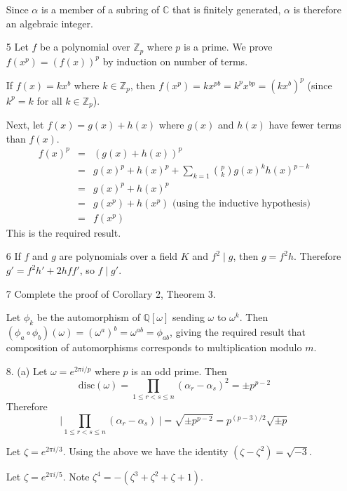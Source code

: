 \documentclass{article}
\newcommand{\w}[0]{\omega}
\newcommand{\z}[0]{\zeta}
\begin{document}
\begin{enumerate}
    Since $\alpha$ is a member of a subring of $\mathbb{C}$ that is finitely generated, $\alpha$ is therefore an algebraic integer.

\item[5]
    Let $f$ be a polynomial over $\mathbb{Z}_p$ where $p$ is a prime.  We prove $f(x^p) = (f(x))^p$ by induction on number of terms.

    If $f(x) = kx^{b}$ where $k \in \mathbb{Z}_p$, then $f(x^p) = kx^{pb} = k^p x^{bp} = (kx^{b})^p$ (since $k^p = k$ for all $k \in \mathbb{Z}_p$).

    Next, let $f(x) = g(x) + h(x)$ where $g(x)$ and $h(x)$ have fewer terms than $f(x)$.
    \begin{eqnarray*}
        f(x)^p          &=& (g(x) + h(x))^p \\
                        &=& g(x)^p + h(x)^p + \sum_{k = 1} \binom{p}{k} g(x)^{k} h(x)^{p - k} \\
                        &=& g(x)^p + h(x)^p \\
                        &=& g(x^p) + h(x^p) \text{ (using the inductive hypothesis)}\\
                        &=& f(x^p)
    \end{eqnarray*}
    This is the required result.

\item[6] If $f$ and $g$ are polynomials over a field $K$ and $f^2 \mid g$, then $g = f^2 h$.  Therefore $g' = f^2 h' + 2 h f f'$, so $f \mid g'$.

\item[7] Complete the proof of Corollary 2, Theorem 3.

Let $\phi_{k}$ be the automorphism of $\mathbb{Q}[\omega]$ sending $\omega$ to $\omega^k$.  Then $(\phi_{a} \circ \phi_{b}) (\omega) = (\omega^{a})^{b} = \omega^{ab} = \phi_{ab}$, giving the required result that composition of automorphisms corresponds to multiplication modulo $m$.

\item[8. (a)] Let $\w = e^{2\pi i/p}$ where $p$ is an odd prime.
Then \[ \text{disc}(\w) = \prod_{1 \le r < s \le n} (\alpha_r - \alpha_s)^2 = \pm p^{p - 2} \]
Therefore \[ \Big\lvert \prod_{1 \le r < s \le n} (\alpha_r - \alpha_s)\ \Big\rvert = \sqrt{\pm p^{p - 2}} = p^{(p - 3) / 2} \sqrt{\pm p} \]

Let $\z = e^{2\pi i /3}$.  Using the above we have the identity $(\z - \z^2) = \sqrt{-3}$.

Let $\z = e^{2\pi i / 5}$.  Note $\z^4 = -(\z^3 + \z^2 + \z + 1)$.


\end{enumerate}
\end{document}
